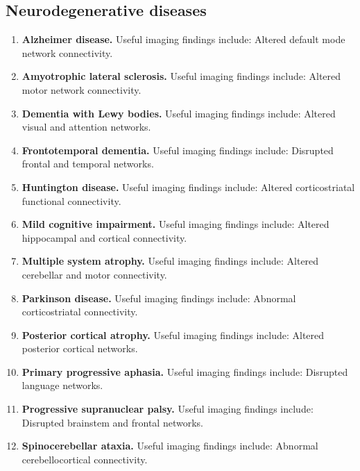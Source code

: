 \subsection{Neurodegenerative diseases}
\begin{enumerate}[leftmargin=*,itemsep=0.45em,topsep=0.4em]
\item \textbf{Alzheimer disease.} Useful imaging findings include: Altered default mode network connectivity.
\item \textbf{Amyotrophic lateral sclerosis.} Useful imaging findings include: Altered motor network connectivity.
\item \textbf{Dementia with Lewy bodies.} Useful imaging findings include: Altered visual and attention networks.
\item \textbf{Frontotemporal dementia.} Useful imaging findings include: Disrupted frontal and temporal networks.
\item \textbf{Huntington disease.} Useful imaging findings include: Altered corticostriatal functional connectivity.
\item \textbf{Mild cognitive impairment.} Useful imaging findings include: Altered hippocampal and cortical connectivity.
\item \textbf{Multiple system atrophy.} Useful imaging findings include: Altered cerebellar and motor connectivity.
\item \textbf{Parkinson disease.} Useful imaging findings include: Abnormal corticostriatal connectivity.
\item \textbf{Posterior cortical atrophy.} Useful imaging findings include: Altered posterior cortical networks.
\item \textbf{Primary progressive aphasia.} Useful imaging findings include: Disrupted language networks.
\item \textbf{Progressive supranuclear palsy.} Useful imaging findings include: Disrupted brainstem and frontal networks.
\item \textbf{Spinocerebellar ataxia.} Useful imaging findings include: Abnormal cerebellocortical connectivity.
\end{enumerate}

